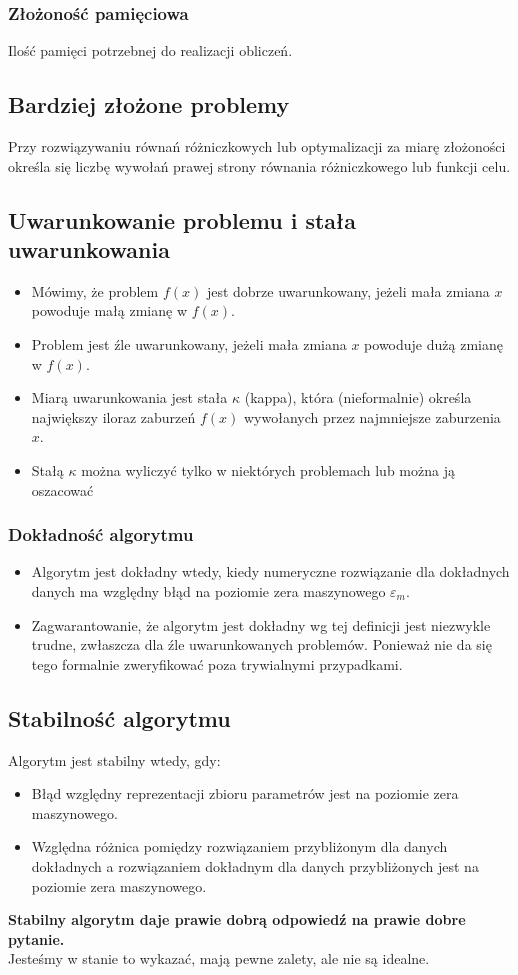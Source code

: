 \documentclass[a4paper]{article}
\begin{document}
\subsubsection{Złożoność pamięciowa}
Ilość pamięci potrzebnej do realizacji obliczeń.

\subsection{Bardziej złożone problemy}
Przy rozwiązywaniu równań różniczkowych lub optymalizacji za miarę złożoności określa się liczbę wywołań prawej strony równania różniczkowego lub funkcji celu.

\subsection{Uwarunkowanie problemu i stała uwarunkowania}
\begin{itemize}
    \item Mówimy, że problem $f(x)$ jest dobrze uwarunkowany, jeżeli mała zmiana $x$ powoduje małą zmianę w $f(x)$.
    \item Problem jest źle uwarunkowany, jeżeli mała zmiana $x$ powoduje dużą zmianę w $f(x)$.
    \item Miarą uwarunkowania jest stała $\kappa$ (kappa), która (nieformalnie) określa największy iloraz zaburzeń $f(x)$ wywołanych przez najmniejsze zaburzenia $x$.
    \item Stałą $\kappa$ można wyliczyć tylko w niektórych problemach lub można ją oszacować
\end{itemize}

\subsubsection{Dokładność algorytmu}
\begin{itemize}
    \item Algorytm jest dokładny wtedy, kiedy numeryczne rozwiązanie dla dokładnych danych ma względny błąd na poziomie zera maszynowego $\varepsilon_m$.
    \item Zagwarantowanie, że algorytm jest dokładny wg tej definicji jest niezwykle trudne, zwłaszcza dla źle uwarunkowanych problemów. Ponieważ nie da się tego formalnie zweryfikować poza trywialnymi przypadkami.
\end{itemize}

\subsection{Stabilność algorytmu}
Algorytm jest stabilny wtedy, gdy:
\begin{itemize}
    \item Błąd względny reprezentacji zbioru parametrów jest na poziomie zera maszynowego.
    \item Względna różnica pomiędzy rozwiązaniem przybliżonym dla danych dokładnych a rozwiązaniem dokładnym dla danych przybliżonych jest na poziomie zera maszynowego.
\end{itemize}
\textbf{Stabilny algorytm daje prawie dobrą odpowiedź na prawie dobre pytanie.} \\
Jesteśmy w stanie to wykazać, mają pewne zalety, ale nie są idealne.
\end{document}
